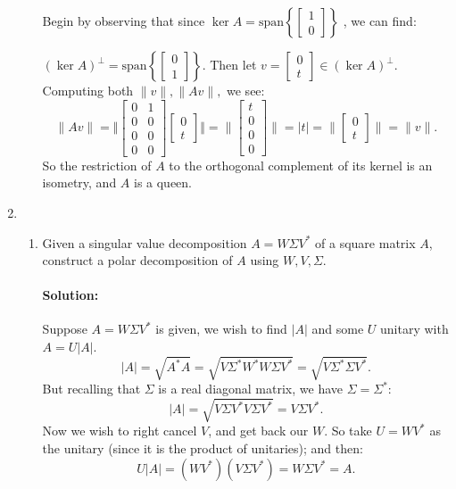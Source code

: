 \documentclass{article}
\begin{document}
\begin{enumerate}
\begin{enumerate}[label= (\alph*)]
    Begin by observing that since $\ker A=\text{span} \left\{ \begin{bmatrix} 1\\0 \end{bmatrix}  \right\} $
    , we can find:

    $\left( \ker A \right) ^{\perp}=\text{span}\left\{ \begin{bmatrix} 0\\1 \end{bmatrix}  \right\}  $. Then let $v=\begin{bmatrix} 0\\t \end{bmatrix} \in (\ker A)^{\perp}$. Computing both $\|v\|,\|Av\|,$ we see:
    \[
    \|Av\|=\Vert \begin{bmatrix} 0&1\\0&0\\ 0&0\\0&0  \end{bmatrix} \begin{bmatrix} 0\\t \end{bmatrix} \Vert=\|\begin{bmatrix} t\\0\\0\\0  \end{bmatrix} \|=|t|=\|\begin{bmatrix} 0\\t \end{bmatrix} \|=\|v\|
    .\] 
    So the restriction of $A$ to the orthogonal complement of its kernel is an isometry, and $A$ is a queen.
\end{enumerate}
\item \begin{enumerate}[label= (\alph*)] 
\item Given a singular value decomposition $A = W \Sigma V^* $ of a square matrix $A$, construct a polar decomposition of $A$ using $W,V,\Sigma$.
    \paragraph{Solution: }Suppose $A=W\Sigma V ^* $ is given, we wish to find $|A|$ and some $U$ unitary with $A = U|A|$. 
    \[
    |A|=\sqrt{A^* A} =\sqrt{V\Sigma^* W^* W\Sigma V^* } =\sqrt{V\Sigma^* \Sigma V^* } 
    .\] 
    But recalling that $\Sigma$ is a real diagonal matrix, we have $\Sigma=\Sigma^* $:
    \[
    |A|=\sqrt{V\Sigma V^* V\Sigma V^* } =V\Sigma V^* 
    .\] 
    Now we wish to right cancel $V$, and get back our $W$. So take $U=WV^* $ as the unitary (since it is the product of unitaries); and then:
     \[
    U|A|=(WV^* )(V\Sigma V^* )=W\Sigma V^* =A
    .\] 


\end{enumerate}
\end{enumerate}
\end{document}
